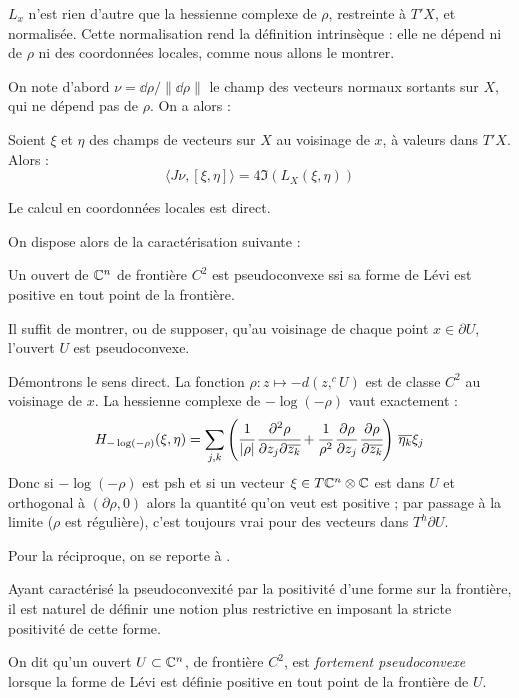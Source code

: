 $L_x$ n'est rien d'autre que la hessienne complexe de $\rho$, restreinte à $T'X$, et normalisée. Cette normalisation rend la définition intrinsèque : elle ne dépend ni de $\rho$ ni des coordonnées locales, comme nous allons le montrer.

On note d'abord $\nu = \dd \rho/\|\dd \rho\|$ le champ des vecteurs normaux sortants sur $X$, qui ne dépend pas de $\rho$. On a alors :

\begin{prop}\label{prop:Levi-invariant}
	Soient $\xi$ et $\eta$ des champs de vecteurs sur $X$ au voisinage de $x$, à valeurs dans $T'X$. Alors :
	\begin{equation*}
		\langle J\nu,[\xi,\eta]\rangle =4\Im(L_X(\xi,\eta))
	\end{equation*}
\end{prop}
\begin{preuve}
	Le calcul en coordonnées locales est direct.
\end{preuve}
On dispose alors de la caractérisation suivante :
\begin{prop}
	Un ouvert de $\mathbb{C}^n$ de frontière $C^2$ est pseudoconvexe ssi sa forme de Lévi est positive en tout point de la frontière.
\end{prop}
\begin{preuve}
Il suffit de montrer, ou de supposer, qu'au voisinage de chaque point $x \in \partial U$, l'ouvert $U$ est pseudoconvexe.

Démontrons le sens direct. La fonction $\rho:z \mapsto -d(z,^cU)$ est de classe $C^2$ au voisinage de $x$. La hessienne complexe de $-\log(-\rho)$ vaut exactement :
\begin{equation*}
H_{-\log(-\rho)}(\xi,\eta)=\sum_{j,k}\left(\cfrac{1}{|\rho|}\,\cfrac{\partial^2\rho}{\partial z_j\partial \overline{z_k}} + \cfrac{1}{\rho^2}\,\cfrac{\partial \rho}{\partial z_j}\,\cfrac{\partial \rho}{\partial \overline{z_k}}\right)\,\overline{\eta_k}\xi_j
\end{equation*}
Donc si $-\log(-\rho)$ est psh et si un vecteur $\xi \in T\mathbb{C}^n \otimes \mathbb{C}$ est dans $U$ et orthogonal à $(\partial \rho,0)$ alors la quantité qu'on veut est positive ; par passage à la limite ($\rho$ est régulière), c'est toujours vrai pour des vecteurs dans $T^h\partial U$.

Pour la réciproque, on se reporte à \cite{demailly1997complex}.
\end{preuve}

Ayant caractérisé la pseudoconvexité par la positivité d'une forme sur la frontière, il est naturel de définir une notion plus restrictive en imposant la stricte positivité de cette forme.
\begin{defn}
On dit qu'un ouvert $U \subset \mathbb{C}^n$, de frontière $C^2$, est \emph{fortement pseudoconvexe} lorsque la forme de Lévi est définie positive en tout point de la frontière de $U$.
\end{defn}
